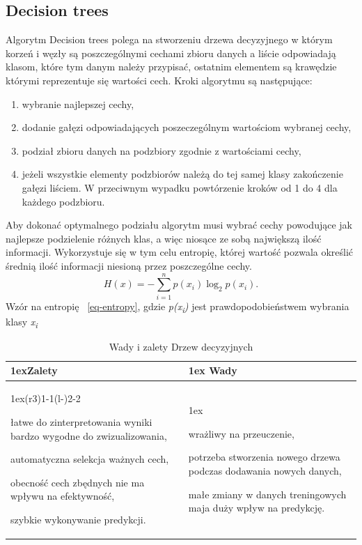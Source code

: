 \subsection{Decision trees}

Algorytm Decision trees polega na stworzeniu drzewa decyzyjnego w którym korzeń i węzły
są poszczególnymi cechami zbioru danych a liście odpowiadają klasom, które tym danym 
należy przypisać, ostatnim elementem są krawędzie którymi reprezentuje się wartości cech. 
Kroki algorytmu są następujące:
\begin{enumerate}
    \item wybranie najlepszej cechy,
    \item dodanie gałęzi odpowiadających poszeczególnym wartościom wybranej cechy,
    \item podział zbioru danych na podzbiory zgodnie z wartościami cechy,
    \item jeżeli wszystkie elementy podzbiorów należą do tej samej klasy 
    zakończenie gałęzi liściem. W przeciwnym wypadku powtórzenie kroków 
    od 1 do 4 dla każdego podzbioru.
\end{enumerate}
Aby dokonać optymalnego podziału algorytm musi wybrać cechy powodujące jak najlepsze
podzielenie różnych klas, a więc niosące ze sobą największą ilość informacji.
Wykorzystuje się w tym celu entropię, której wartość pozwala określić średnią ilość 
informacji niesioną przez poszczególne cechy.
\begin{equation}
    H(x)=-\sum_{i=1}^n p(x_i) \log_2 p(x_i).
    \label{eq-entropy}
\end{equation}
Wzór na entropię ~\ref{eq-entropy}, gdzie \textit{p(x\textsubscript{i})} jest prawdopodobieństwem
wybrania klasy \textit{x\textsubscript{i}}
\begin{table}[h]
    \begin{tabularx}{\linewidth}{>{\parskip1ex}X@{\kern4\tabcolsep}>{\parskip1ex}X}
    \toprule
    \hfil\bfseries Zalety
    &
    \hfil\bfseries Wady
    \\\cmidrule(r{3\tabcolsep}){1-1}\cmidrule(l{-\tabcolsep}){2-2}
    
    łatwe do zinterpretowania wyniki bardzo wygodne do zwizualizowania,\par
    automatyczna selekcja ważnych cech,\par 
    obecność cech zbędnych nie ma wpływu na efektywność,\par
    szybkie wykonywanie predykcji.\par
    &
    
    wrażliwy na przeuczenie,\par
    potrzeba stworzenia nowego drzewa podczas dodawania nowych danych,\par
    małe zmiany w danych treningowych maja duży wpływ na predykcję.\par
    
    \\\bottomrule
    \end{tabularx}
    \caption{Wady i zalety Drzew decyzyjnych}
\end{table}

